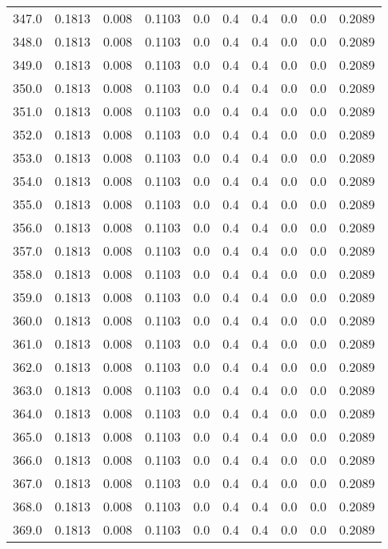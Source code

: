 \begin{longtable}{lrrrrrrrrr}
347.0 & 0.1813 & 0.008 & 0.1103 & 0.0 & 0.4 & 0.4 & 0.0 & 0.0 & 0.2089 \\
348.0 & 0.1813 & 0.008 & 0.1103 & 0.0 & 0.4 & 0.4 & 0.0 & 0.0 & 0.2089 \\
349.0 & 0.1813 & 0.008 & 0.1103 & 0.0 & 0.4 & 0.4 & 0.0 & 0.0 & 0.2089 \\
350.0 & 0.1813 & 0.008 & 0.1103 & 0.0 & 0.4 & 0.4 & 0.0 & 0.0 & 0.2089 \\
351.0 & 0.1813 & 0.008 & 0.1103 & 0.0 & 0.4 & 0.4 & 0.0 & 0.0 & 0.2089 \\
352.0 & 0.1813 & 0.008 & 0.1103 & 0.0 & 0.4 & 0.4 & 0.0 & 0.0 & 0.2089 \\
353.0 & 0.1813 & 0.008 & 0.1103 & 0.0 & 0.4 & 0.4 & 0.0 & 0.0 & 0.2089 \\
354.0 & 0.1813 & 0.008 & 0.1103 & 0.0 & 0.4 & 0.4 & 0.0 & 0.0 & 0.2089 \\
355.0 & 0.1813 & 0.008 & 0.1103 & 0.0 & 0.4 & 0.4 & 0.0 & 0.0 & 0.2089 \\
356.0 & 0.1813 & 0.008 & 0.1103 & 0.0 & 0.4 & 0.4 & 0.0 & 0.0 & 0.2089 \\
357.0 & 0.1813 & 0.008 & 0.1103 & 0.0 & 0.4 & 0.4 & 0.0 & 0.0 & 0.2089 \\
358.0 & 0.1813 & 0.008 & 0.1103 & 0.0 & 0.4 & 0.4 & 0.0 & 0.0 & 0.2089 \\
359.0 & 0.1813 & 0.008 & 0.1103 & 0.0 & 0.4 & 0.4 & 0.0 & 0.0 & 0.2089 \\
360.0 & 0.1813 & 0.008 & 0.1103 & 0.0 & 0.4 & 0.4 & 0.0 & 0.0 & 0.2089 \\
361.0 & 0.1813 & 0.008 & 0.1103 & 0.0 & 0.4 & 0.4 & 0.0 & 0.0 & 0.2089 \\
362.0 & 0.1813 & 0.008 & 0.1103 & 0.0 & 0.4 & 0.4 & 0.0 & 0.0 & 0.2089 \\
363.0 & 0.1813 & 0.008 & 0.1103 & 0.0 & 0.4 & 0.4 & 0.0 & 0.0 & 0.2089 \\
364.0 & 0.1813 & 0.008 & 0.1103 & 0.0 & 0.4 & 0.4 & 0.0 & 0.0 & 0.2089 \\
365.0 & 0.1813 & 0.008 & 0.1103 & 0.0 & 0.4 & 0.4 & 0.0 & 0.0 & 0.2089 \\
366.0 & 0.1813 & 0.008 & 0.1103 & 0.0 & 0.4 & 0.4 & 0.0 & 0.0 & 0.2089 \\
367.0 & 0.1813 & 0.008 & 0.1103 & 0.0 & 0.4 & 0.4 & 0.0 & 0.0 & 0.2089 \\
368.0 & 0.1813 & 0.008 & 0.1103 & 0.0 & 0.4 & 0.4 & 0.0 & 0.0 & 0.2089 \\
369.0 & 0.1813 & 0.008 & 0.1103 & 0.0 & 0.4 & 0.4 & 0.0 & 0.0 & 0.2089 \\

\end{longtable}
